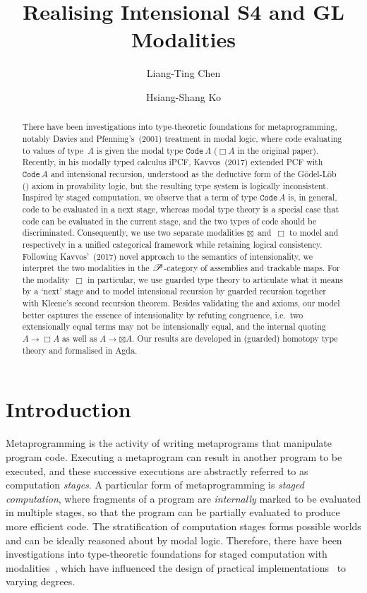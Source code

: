 \documentclass[draft,a4paper,UKenglish,numberwithinsect,cleveref,thm-restate]{lipics-v2021}
\title{Realising Intensional S4 and GL Modalities}
\author{Liang-Ting Chen}%
  {Institute of Information Science, Academia Sinica, Taiwan~\url{https://l-tchen.github.io}}%
  {liang.ting.chen.tw@gmail.com}%
  {https://orcid.org/0000-0002-3250-1331}{}
\author{Hsiang-Shang Ko}%
  {Institute of Information Science, Academia Sinica, Taiwan~\url{https://josh-hs-ko.github.io}}%
  {joshko@iis.sinica.edu.tw}%
  {https://orcid.org/0000-0002-2439-1048}{}
\numberwithin{equation}{section}
\theoremstyle{definition}
\theoremstyle{plain}
\begin{document}
\maketitle

\begin{abstract}

There have been investigations into type-theoretic foundations for metaprogramming, notably Davies and Pfenning's~(2001) treatment in \SFour modal logic, where code evaluating to values of type~$A$ is given the modal type $\mathtt{Code}\,A$ ($\Box A$ in the original paper).
Recently, in his modally typed calculus iPCF, Kavvos~(2017) extended PCF with $\mathtt{Code}\,A$ and intensional recursion, understood as the deductive form of the Gödel-Löb (\GL) axiom in provability logic, but the resulting type system is logically inconsistent.
Inspired by staged computation, we observe that a term of type $\mathtt{Code}\,A$ is, in general, code to be evaluated in a next stage, whereas \SFour modal type theory is a special case that code can be evaluated in the current stage, and the two types of code should be discriminated.
Consequently, we use two separate modalities $\boxtimes$~and~$\Box$ to model \SFour and \GL respectively in a unified categorical framework while retaining logical consistency.
Following Kavvos'~(2017) novel approach to the semantics of intensionality, we interpret the two modalities in the $\mathscr{P}$-category of assemblies and trackable maps.
For the \GL modality~$\Box$ in particular, we use guarded type theory to articulate what it means by a `next' stage and to model intensional recursion by guarded recursion together with Kleene's second recursion theorem.
Besides validating the \SFour and \GL axioms, our model better captures the essence of intensionality by refuting congruence, i.e.\ two extensionally equal terms may not be intensionally equal, and the internal quoting $A \to \Box A$ as well as $A \to \boxtimes A$.
Our results are developed in (guarded) homotopy type theory and formalised in Agda.
\end{abstract}

\section{Introduction}\label{sec:intro}

Metaprogramming is the activity of writing metaprograms that manipulate program code.
Executing a metaprogram can result in another program to be executed, and these successive executions are abstractly referred to as computation \emph{stages}.
A particular form of metaprogramming is \emph{staged computation}, where fragments of a program are \emph{internally} marked to be evaluated in multiple stages, so that the program can be partially evaluated to produce more efficient code.
The stratification of computation stages forms possible worlds and can be ideally reasoned about by modal logic.
Therefore, there have been investigations into type-theoretic foundations for staged computation with modalities~\cite{Davies2017,Davies2001b,Kavvos2017a,Nanevski2008}, which have influenced the design of practical implementations~\cite{Kiselyov2014,Sheard2002,Taha2000} to varying degrees.
\end{document}
